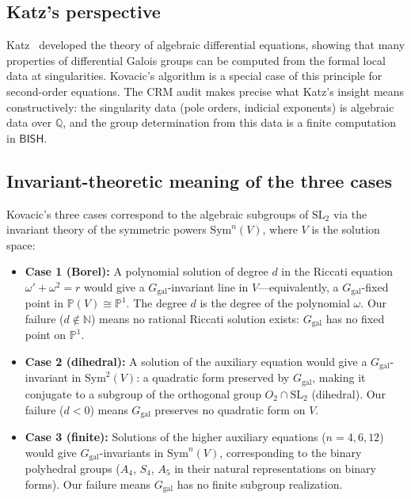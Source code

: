 \documentclass[11pt]{article}
\theoremstyle{plain}
\theoremstyle{definition}
\theoremstyle{remark}
\newcommand{\N}{\mathbb{N}}
\newcommand{\Q}{\mathbb{Q}}
\newcommand{\SL}{\mathrm{SL}}
\newcommand{\Sym}{\mathrm{Sym}}
\newcommand{\Ggal}{G_{\mathrm{gal}}}
\newcommand{\BISH}{\mathsf{BISH}}
\begin{document}
\subsection{Katz's perspective}

Katz~\cite{Katz1990} developed the theory of algebraic differential equations, showing that many properties of differential Galois groups can be computed from the formal local data at singularities.
Kovacic's algorithm is a special case of this principle for second-order equations.
The CRM audit makes precise what Katz's insight means constructively: the singularity data (pole orders, indicial exponents) is algebraic data over $\Q$, and the group determination from this data is a finite computation in $\BISH$.

\subsection{Invariant-theoretic meaning of the three cases}

Kovacic's three cases correspond to the algebraic subgroups of $\SL_2$ via the invariant theory of the symmetric powers $\Sym^n(V)$, where $V$ is the solution space:

\begin{itemize}
  \item \textbf{Case 1 (Borel):} A polynomial solution of degree $d$ in the Riccati equation $\omega' + \omega^2 = r$ would give a $\Ggal$-invariant line in $V$---equivalently, a $\Ggal$-fixed point in $\mathbb{P}(V) \cong \mathbb{P}^1$.
  The degree $d$ is the degree of the polynomial $\omega$.
  Our failure ($d \notin \N$) means no rational Riccati solution exists: $\Ggal$ has no fixed point on $\mathbb{P}^1$.

  \item \textbf{Case 2 (dihedral):} A solution of the auxiliary equation would give a $\Ggal$-invariant in $\Sym^2(V)$: a quadratic form preserved by $\Ggal$, making it conjugate to a subgroup of the orthogonal group $O_2 \cap \SL_2$ (dihedral).
  Our failure ($d < 0$) means $\Ggal$ preserves no quadratic form on $V$.

  \item \textbf{Case 3 (finite):} Solutions of the higher auxiliary equations ($n = 4, 6, 12$) would give $\Ggal$-invariants in $\Sym^n(V)$, corresponding to the binary polyhedral groups ($A_4$, $S_4$, $A_5$ in their natural representations on binary forms).
  Our failure means $\Ggal$ has no finite subgroup realization.
\end{itemize}
\end{document}
